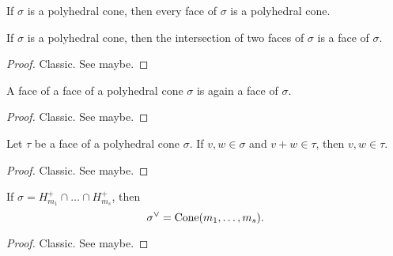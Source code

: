 \begin{lemma}
  \label{1-2-6-face-polyhedral-cone}

  If $\sigma$ is a polyhedral cone, then every face of $\sigma$ is a polyhedral cone.
\end{lemma}


\begin{lemma}
  \label{1-2-6-inter-faces}

  If $\sigma$ is a polyhedral cone, then the intersection of two faces of $\sigma$ is a face of $\sigma$.
\end{lemma}
\begin{proof}
  \uses{}

  Classic. See \cite{Oda_1988} maybe.
\end{proof}


\begin{lemma}
  \label{1-2-6-face-face}

  A face of a face of a polyhedral cone $\sigma$ is again a face of $\sigma$.
\end{lemma}
\begin{proof}
  \uses{}

  Classic. See \cite{Oda_1988} maybe.
\end{proof}


\begin{lemma}
  \label{1-2-7-face-mem-of-add}

  Let $\tau$ be a face of a polyhedral cone $\sigma$. If $v, w \in \sigma$ and $v + w \in \tau$, then $v, w \in \tau$.
\end{lemma}
\begin{proof}
  \uses{}

  Classic. See \cite{Oda_1988} maybe.
\end{proof}


\begin{proposition}
  \label{1-2-8-dual-cone-inter-halfspaces}

  If $\sigma = H_{m_1}^+ \cap \dots \cap H_{m_s}^+$, then
  $$\sigma^\vee = \operatorname{Cone}(m_1, \dots, m_s).$$
\end{proposition}
\begin{proof}
  \uses{}

  Classic. See \cite{Oda_1988} maybe.
\end{proof}


